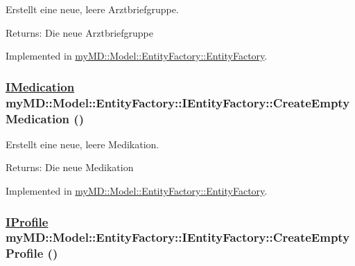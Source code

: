 Erstellt eine neue, leere Arztbriefgruppe. 

\begin{Desc}
\item[Returns:]Die neue Arztbriefgruppe\end{Desc}


Implemented in \hyperlink{classmy_m_d_1_1_model_1_1_entity_factory_1_1_entity_factory_7ce2fe6e33d0a78829c47a6b2f35e0fe}{my\-MD::Model::Entity\-Factory::Entity\-Factory}.\hypertarget{interfacemy_m_d_1_1_model_1_1_entity_factory_1_1_i_entity_factory_3fd69c99a27372f99eae3cda6e23e2e6}{
\subsubsection[CreateEmptyMedication]{\setlength{\rightskip}{0pt plus 5cm}\hyperlink{interfacemy_m_d_1_1_model_interface_1_1_data_model_interface_1_1_i_medication}{IMedication} my\-MD::Model::Entity\-Factory::IEntity\-Factory::Create\-Empty\-Medication ()}}
\label{d0/d33/interfacemy_m_d_1_1_model_1_1_entity_factory_1_1_i_entity_factory_3fd69c99a27372f99eae3cda6e23e2e6}


Erstellt eine neue, leere Medikation. 

\begin{Desc}
\item[Returns:]Die neue Medikation\end{Desc}


Implemented in \hyperlink{classmy_m_d_1_1_model_1_1_entity_factory_1_1_entity_factory_3fd69c99a27372f99eae3cda6e23e2e6}{my\-MD::Model::Entity\-Factory::Entity\-Factory}.\hypertarget{interfacemy_m_d_1_1_model_1_1_entity_factory_1_1_i_entity_factory_d81849285c0ecfe46b822095df995e8e}{
\subsubsection[CreateEmptyProfile]{\setlength{\rightskip}{0pt plus 5cm}\hyperlink{interfacemy_m_d_1_1_model_interface_1_1_data_model_interface_1_1_i_profile}{IProfile} my\-MD::Model::Entity\-Factory::IEntity\-Factory::Create\-Empty\-Profile ()}}
\label{d0/d33/interfacemy_m_d_1_1_model_1_1_entity_factory_1_1_i_entity_factory_d81849285c0ecfe46b822095df995e8e}


